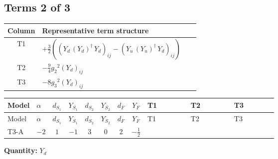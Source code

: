 \documentclass[8pt]{article}
\begin{document}
\begin{landscape}
\subsection*{Terms 2 of 3}
\begin{center}
\begin{tabular}{@{}c >{\raggedright\arraybackslash}p{0.82\linewidth}@{}}
\toprule
Column & Representative term structure \\
\midrule
T1 & \(\displaystyle +\frac{3}{2} (\left({Y_d}\,\left({Y_d}\right)^{\dagger}\,{Y_d}\right)_{ij}-\left({Y_u}\,\left({Y_u}\right)^{\dagger}\,{Y_d}\right)_{ij})\) \\
\midrule
T2 & \(\displaystyle -\frac{9}{4} {g_2}^2 \left({Y_d}\right)_{ij}\) \\
\midrule
T3 & \(\displaystyle -8 {g_3}^2 \left({Y_d}\right)_{ij}\) \\
\midrule
\bottomrule
\end{tabular}
\end{center}
\smallskip
\tiny
\begin{longtable}{@{}llcccccc >{\raggedright\arraybackslash}p{0.21\linewidth} >{\raggedright\arraybackslash}p{0.21\linewidth} >{\raggedright\arraybackslash}p{0.21\linewidth}@{}}
\toprule
Model & $\alpha$ & $d_{S_1}$ & $Y_{S_1}$ & $d_{S_2}$ & $Y_{S_2}$ & $d_F$ & $Y_F$ & T1 & T2 & T3 \\
\midrule
\endfirsthead
\toprule
Model & $\alpha$ & $d_{S_1}$ & $Y_{S_1}$ & $d_{S_2}$ & $Y_{S_2}$ & $d_F$ & $Y_F$ & T1 & T2 & T3 \\
\midrule
\endhead
T3-A & $-2$ & $1$ & $-1$ & $3$ & $0$ & $2$ & $-\frac{1}{2}$ & \scriptsize\adjustbox{max width=\linewidth}{$\begin{gathered} +\frac{3}{2} (\left({Y_d}\,\left({Y_d}\right)^{\dagger}\,{Y_d}\right)_{ij}-\left({Y_u}\,\left({Y_u}\right)^{\dagger}\,{Y_d}\right)_{ij})\end{gathered}$} & \scriptsize\adjustbox{max width=\linewidth}{$\begin{gathered} -\frac{9}{4} {g_2}^2 \left({Y_d}\right)_{ij}\end{gathered}$} & \scriptsize\adjustbox{max width=\linewidth}{$\begin{gathered} -8 {g_3}^2 \left({Y_d}\right)_{ij}\end{gathered}$} \\
\midrule
\bottomrule
\end{longtable}
\clearpage
\noindent\textbf{Quantity: }$Y_d$\par\smallskip

\end{landscape}
\end{document}
